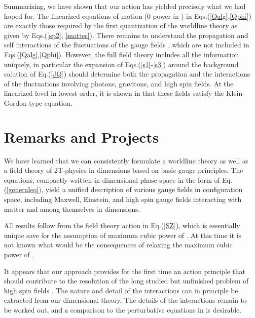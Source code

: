 \documentclass[a4paper,12pt]{article}
\begin{document}
Summarizing, we have shown that our action \coordHE{} has
yielded precisely what we had hoped for. The linearized equations
of motion (0\coordHE{} power in \coordHE{}) in Eqs.(\ref{Qalg},\ref{Qphi})
are exactly those required by the first quantization of the
worldline theory as given by Eqs.(\ref{sp2}, \ref{matter}). There
remains to understand the propagation and self interactions of the
fluctuations of the gauge fields \coordHE{}, which are not included
in Eqs.(\ref{Qalg},\ref{Qphi}). However, the full field theory
includes all the information uniquely, in particular the expansion
of Eqs.(\ref{s1}-\ref {s3}) around the background solution
\coordHE{} of Eq.(\ref {JQ}) should determine
both the propagation and the interactions of the fluctuations
involving photons, gravitons, and high spin fields. At the
linearized level in lowest order, it is shown in \cite{NCu11} that
these fields satisfy the Klein-Gordon type equation.

\section{Remarks and Projects}

We have learned that we can consistently formulate a worldline
theory as well as a field theory of 2T-physics in \coordHE{} dimensions
based on basic gauge principles. The equations, compactly written
in \coordHE{} dimensional phase space in the form of
Eq.(\ref{generaleq}), yield a unified description of various
gauge fields in configuration space, including Maxwell, Einstein,
and high spin gauge fields interacting with matter and among
themselves in \coordHE{} dimensions.

All results follow from the field theory action in Eq.(\ref{SZ}),
which is essentially unique save for the assumption of maximum
cubic power of \coordHE{}. At this time it is not known what
would be the consequences of relaxing the maximum cubic power of
\coordHE{}.

It appears that our approach provides for the first time an action principle
that should contribute to the resolution of the long studied but unfinished
problem of high spin fields \cite{vasil}\cite{segal}\cite{highspin}\cite
{sezgin}. The nature and detail of the interactions can in principle be
extracted from our \coordHE{} dimensional theory. The details of the interactions
remain to be worked out, and a comparison to the perturbative equations in
\cite{vasil} is desirable.
\end{document}
